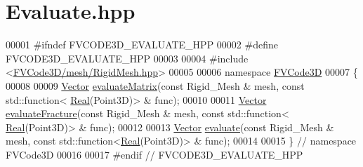 \hypertarget{Evaluate_8hpp_source}{}\section{Evaluate.\+hpp}
\label{Evaluate_8hpp_source}

\begin{DoxyCode}
00001 \textcolor{preprocessor}{#ifndef FVCODE3D\_EVALUATE\_HPP}
00002 \textcolor{preprocessor}{#define FVCODE3D\_EVALUATE\_HPP}
00003 
00004 \textcolor{preprocessor}{#include <\hyperlink{RigidMesh_8hpp}{FVCode3D/mesh/RigidMesh.hpp}>}
00005 
00006 \textcolor{keyword}{namespace }\hyperlink{namespaceFVCode3D}{FVCode3D}
00007 \{
00008 
00009 \hyperlink{namespaceFVCode3D_a16ccf345652402bccd1a5d2e6782526c}{Vector} \hyperlink{namespaceFVCode3D_a3d3cdaa3f99983f1aa2d079caded2585}{evaluateMatrix}(\textcolor{keyword}{const} Rigid\_Mesh & mesh, \textcolor{keyword}{const} std::function<
      \hyperlink{namespaceFVCode3D_a40c1f5588a248569d80aa5f867080e83}{Real}(Point3D)> & func);
00010 
00011 \hyperlink{namespaceFVCode3D_a16ccf345652402bccd1a5d2e6782526c}{Vector} \hyperlink{namespaceFVCode3D_a9d3700c347e26f9a442a95785abceac6}{evaluateFracture}(\textcolor{keyword}{const} Rigid\_Mesh & mesh, \textcolor{keyword}{const} std::function<
      \hyperlink{namespaceFVCode3D_a40c1f5588a248569d80aa5f867080e83}{Real}(Point3D)> & func);
00012 
00013 \hyperlink{namespaceFVCode3D_a16ccf345652402bccd1a5d2e6782526c}{Vector} \hyperlink{namespaceFVCode3D_a113366cb939ded701e04649337315295}{evaluate}(\textcolor{keyword}{const} Rigid\_Mesh & mesh, \textcolor{keyword}{const} std::function<\hyperlink{namespaceFVCode3D_a40c1f5588a248569d80aa5f867080e83}{Real}(Point3D)> & func);
00014 
00015 \} \textcolor{comment}{// namespace FVCode3D}
00016 
00017 \textcolor{preprocessor}{#endif // FVCODE3D\_EVALUATE\_HPP}
\end{DoxyCode}
